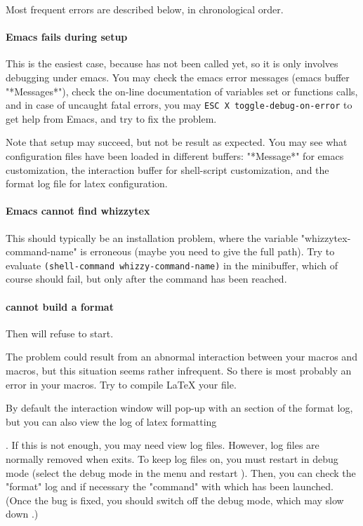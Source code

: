 \documentclass[12pt]{article}
\begin{document}
Most frequent errors are described below, in chronological order.


\paragraph {Emacs fails during setup}

This is the easiest case, because {\whizzy} has not been called yet, so it
is only involves debugging under emacs.
You may check the emacs error messages (emacs buffer \lst"*Messages*"),
check the on-line documentation of variables set or functions calls, and
in case of uncaught fatal errors, you may
\verb"ESC X toggle-debug-on-error" to get help from Emacs, and try to fix
the problem.

Note that setup may succeed, but not be result as expected.
You may see what configuration files have been loaded in different buffers:
\lst"*Message*" for emacs customization, the interaction buffer
for shell-script customization, and the format log file for latex
configuration.


\paragraph {Emacs cannot find whizzytex}

This should typically be an installation problem, where the variable
\lst"whizzytex-command-name" is erroneous (maybe you need to give the full
path). Try to evaluate \verb"(shell-command whizzy-command-name)" in the
minibuffer, which of course should fail, but only after the command has been
reached.

\paragraph {{\whizzy} cannot build a format}

Then {\whizzy} will refuse to start.

The problem could result from an abnormal interaction between your macros
and {\whizzy} macros, but this situation seems rather infrequent.  So there
is most probably an error in your macros.  Try to compile {\LaTeX} your
file.

By default the interaction window will pop-up with an section of the format
log, but you can also view the log of latex formatting

. If this is not enough, you may need view log files.  However, log
files are normally removed when {\whizzy} exits.  To keep log files on,
you must restart {\whizzy} in debug mode (select the debug mode in the
menu and restart {\whizzy}). Then, you can check the \lst"format" log and
if necessary the \lst"command" with which {\whizzy} has been launched.
(Once the bug is fixed, you should switch off the debug mode, which may slow
down {\whizzy}.)
\end{document}
